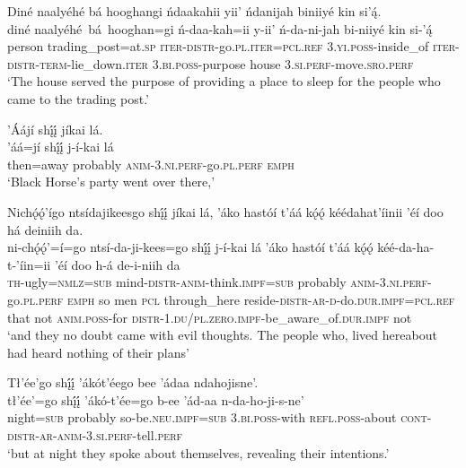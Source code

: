 \ea\label{ex:text1-22-8}
Diné naalyéhé bá hooghangi ńdaakahii yii’ ńdanijah biniiyé kin si’ą́.\\
\gll diné	naalyéhé~bá~{hooghan=gi}	ń-daa-kah=ii	y-ii’	ń-da-ni-jah	bi-niiyé	kin	si-’ą́\\
     person	trading\_post=at.\textsc{sp}	\textsc{iter}-\textsc{distr}-go.\textsc{pl}.\textsc{iter}=\textsc{pcl}.\textsc{ref}	3.\textsc{yi}.\textsc{poss}-inside\_of	\textsc{iter}-\textsc{distr}-\textsc{term}-lie\_down.\textsc{iter}	3.\textsc{bi}.\textsc{poss}-purpose	house	3.\textsc{si}.\textsc{perf}-move.\textsc{sro}.\textsc{perf}\\
\glt `The house served the purpose of providing a place to sleep for the people who came to the trading post.'
\z

\ea\label{ex:text1-22-9}
’Áájí shį́į́ jíkai lá.\\
\gll ’áá=jí	shį́į́	j-í-kai	lá\\
     then=away	probably	\textsc{anim}-3.\textsc{ni}.\textsc{perf}-go.\textsc{pl}.\textsc{perf}	\textsc{emph}\\
\glt `Black Horse's party went over there,'
\z

\ea\label{ex:text1-22-10}
Nichǫ́ǫ́’ígo ntsídajikeesgo shį́į́ jíkai lá, ’áko hastóí t’áá kǫ́ǫ́ kéédahat’íinii ’éí doo há deiniih da.\\
\gll ni-chǫ́ǫ́’=í=go	ntsí-da-ji-kees=go	shį́į́	j-í-kai	lá	’áko	hastóí	t’áá	kǫ́ǫ́	kéé-da-ha-t-’íin=ii	’éí	doo	h-á	de-i-niih	da\\
     \textsc{th}-ugly=\textsc{nmlz}=\textsc{sub}	mind-\textsc{distr}-\textsc{anim}-think.\textsc{impf}=\textsc{sub}	probably	\textsc{anim}-3.\textsc{ni}.\textsc{perf}-go.\textsc{pl}.\textsc{perf}	\textsc{emph}	so	men	\textsc{pcl}	through\_here	reside-\textsc{distr}-\textsc{ar}-\textsc{d}-do.\textsc{dur}.\textsc{impf}=\textsc{pcl}.\textsc{ref}	that	not	\textsc{anim}.\textsc{poss}-for	\textsc{distr}-1.\textsc{du}/\textsc{pl}.\textsc{zero}.\textsc{impf}-be\_aware\_of.\textsc{dur}.\textsc{impf}	not\\
\glt `and they no doubt came with evil thoughts. The people who, lived hereabout had heard nothing of their plans'
\z

\ea\label{ex:text1-22-11}
Tł’ée’go shį́į́ ’ákót’éego bee ’ádaa ndahojisne’.\\
\gll tł’ée’=go	shį́į́	’ákó-t’ée=go	b-ee	’ád-aa	n-da-ho-ji-s-ne’\\
     night=\textsc{sub}	probably	so-be.\textsc{neu}.\textsc{impf}=\textsc{sub}	3.\textsc{bi}.\textsc{poss}-with	\textsc{refl}.\textsc{poss}-about	\textsc{cont}-\textsc{distr}-\textsc{ar}-\textsc{anim}-3.\textsc{si}.\textsc{perf}-tell.\textsc{perf}\\
\glt `but at night they spoke about themselves, revealing their intentions.'
\z

